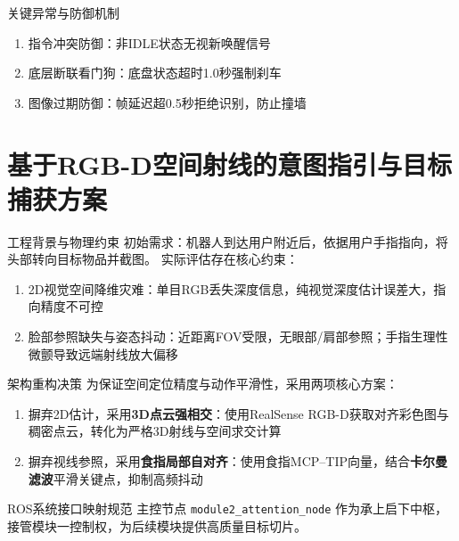 \documentclass{beamer}
\begin{document}
    \begin{frame}{关键异常与防御机制}
        \begin{enumerate}
            \item 指令冲突防御：非IDLE状态无视新唤醒信号
            \item 底层断联看门狗：底盘状态超时1.0秒强制刹车
            \item 图像过期防御：帧延迟超0.5秒拒绝识别，防止撞墙
        \end{enumerate}
    \end{frame}

    \section{基于RGB-D空间射线的意图指引与目标捕获方案}

    \begin{frame}{工程背景与物理约束}
        初始需求：机器人到达用户附近后，依据用户手指指向，将头部转向目标物品并截图。
        实际评估存在核心约束：
        \begin{enumerate}
            \item[(1).] 2D视觉空间降维灾难：单目RGB丢失深度信息，纯视觉深度估计误差大，指向精度不可控
            \item[(2).] 脸部参照缺失与姿态抖动：近距离FOV受限，无眼部/肩部参照；手指生理性微颤导致远端射线放大偏移
        \end{enumerate}
    \end{frame}

    \begin{frame}{架构重构决策}
        为保证空间定位精度与动作平滑性，采用两项核心方案：
        \begin{enumerate}
            \item[(1).] 摒弃2D估计，采用\textbf{3D点云强相交}：使用RealSense RGB-D获取对齐彩色图与稠密点云，转化为严格3D射线与空间求交计算
            \item[(2).] 摒弃视线参照，采用\textbf{食指局部自对齐}：使用食指MCP–TIP向量，结合\textbf{卡尔曼滤波}平滑关键点，抑制高频抖动
        \end{enumerate}
    \end{frame}

    \begin{frame}{ROS系统接口映射规范}
        主控节点 \texttt{module2\_attention\_node} 作为承上启下中枢，接管模块一控制权，为后续模块提供高质量目标切片。
    \end{frame}
\end{document}
